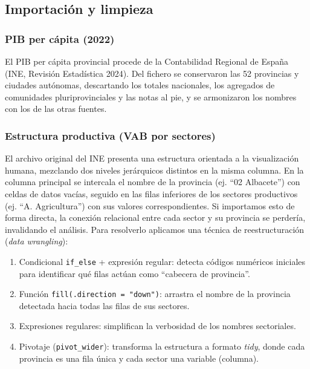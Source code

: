 \documentclass[econometrics,article,submit,moreauthors,pdftex]{Definitions/mdpi}
\providecommand{\tightlist}{%
  \setlength{\itemsep}{0pt}\setlength{\parskip}{0pt}}
\begin{document}
\subsection{Importación y limpieza}\label{importaciuxf3n-y-limpieza}

\subsubsection{PIB per cápita (2022)}\label{pib-per-cuxe1pita-2022}

El PIB per cápita provincial procede de la Contabilidad Regional de
España (INE, Revisión Estadística 2024). Del fichero se conservaron las
52 provincias y ciudades autónomas, descartando los totales nacionales,
los agregados de comunidades pluriprovinciales y las notas al pie, y se
armonizaron los nombres con los de las otras fuentes.

\subsubsection{Estructura productiva (VAB por
sectores)}\label{estructura-productiva-vab-por-sectores}

El archivo original del INE presenta una estructura orientada a la
visualización humana, mezclando dos niveles jerárquicos distintos en la
misma columna. En la columna principal se intercala el nombre de la
provincia (ej. ``02 Albacete'') con celdas de datos vacías, seguido en
las filas inferiores de los sectores productivos (ej. ``A.
Agricultura'') con sus valores correspondientes. Si importamos esto de
forma directa, la conexión relacional entre cada sector y su provincia
se perdería, invalidando el análisis. Para resolverlo aplicamos una
técnica de reestructuración (\emph{data wrangling}):

\begin{enumerate}
\def\labelenumi{\arabic{enumi}.}
\tightlist
\item
  Condicional \texttt{if\_else} + expresión regular: detecta códigos
  numéricos iniciales para identificar qué filas actúan como ``cabecera
  de provincia''.
\item
  Función \texttt{fill(.direction\ =\ "down")}: arrastra el nombre de la
  provincia detectada hacia todas las filas de sus sectores.
\item
  Expresiones regulares: simplifican la verbosidad de los nombres
  sectoriales.
\item
  Pivotaje (\texttt{pivot\_wider}): transforma la estructura a formato
  \emph{tidy}, donde cada provincia es una fila única y cada sector una
  variable (columna).
\end{enumerate}
\end{document}
